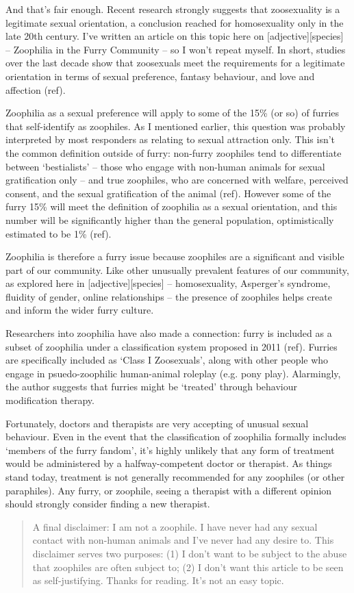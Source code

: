 And that's fair enough. Recent research strongly suggests that zoosexuality is a legitimate sexual orientation, a conclusion reached for homosexuality only in the late 20th century. I've written an article on this topic here on [adjective][species] -- Zoophilia in the Furry Community -- so I won't repeat myself. In short, studies over the last decade show that zoosexuals meet the requirements for a legitimate orientation in terms of sexual preference, fantasy behaviour, and love and affection (ref).

Zoophilia as a sexual preference will apply to some of the 15\% (or so) of furries that self-identify as zoophiles. As I mentioned earlier, this question was probably interpreted by most responders as relating to sexual attraction only. This isn't the common definition outside of furry: non-furry zoophiles tend to differentiate between `bestialists' -- those who engage with non-human animals for sexual gratification only -- and true zoophiles, who are concerned with welfare, perceived consent, and the sexual gratification of the animal (ref). However some of the furry 15\% will meet the definition of zoophilia as a sexual orientation, and this number will be significantly higher than the general population, optimistically estimated to be 1\% (ref).

Zoophilia is therefore a furry issue because zoophiles are a significant and visible part of our community. Like other unusually prevalent features of our community, as explored here in [adjective][species] -- homosexuality, Asperger's syndrome, fluidity of gender, online relationships -- the presence of zoophiles helps create and inform the wider furry culture.

Researchers into zoophilia have also made a connection: furry is included as a subset of zoophilia under a classification system proposed in 2011 (ref). Furries are specifically included as `Class I Zoosexuals', along with other people who engage in psuedo-zoophilic human-animal roleplay (e.g. pony play). Alarmingly, the author suggests that furries might be `treated' through behaviour modification therapy.

Fortunately, doctors and therapists are very accepting of unusual sexual behaviour. Even in the event that the classification of zoophilia formally includes `members of the furry fandom', it's highly unlikely that any form of treatment would be administered by a halfway-competent doctor or therapist. As things stand today, treatment is not generally recommended for any zoophiles (or other paraphiles). Any furry, or zoophile, seeing a therapist with a different opinion should strongly consider finding a new therapist.

\begin{quote}
  A final disclaimer: I am not a zoophile. I have never had any sexual contact with non-human animals and I've never had any desire to. This disclaimer serves two purposes: (1) I don't want to be subject to the abuse that zoophiles are often subject to; (2) I don't want this article to be seen as self-justifying. Thanks for reading. It's not an easy topic.
\end{quote}
